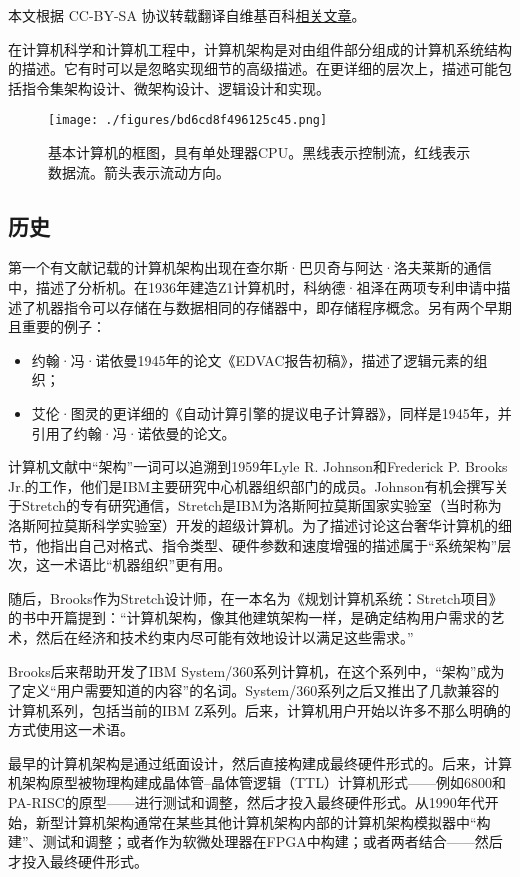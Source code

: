 
本文根据 CC-BY-SA 协议转载翻译自维基百科\href{https://en.wikipedia.org/wiki/Computer_architecture}{相关文章}。
  
在计算机科学和计算机工程中，计算机架构是对由组件部分组成的计算机系统结构的描述。它有时可以是忽略实现细节的高级描述。在更详细的层次上，描述可能包括指令集架构设计、微架构设计、逻辑设计和实现。
\begin{figure}[ht]
\centering
\texttt{[image: ./figures/bd6cd8f496125c45.png]}
\caption{基本计算机的框图，具有单处理器CPU。黑线表示控制流，红线表示数据流。箭头表示流动方向。} \label{fig_CORE_1}
\end{figure}
\subsection{历史}  
第一个有文献记载的计算机架构出现在查尔斯·巴贝奇与阿达·洛夫莱斯的通信中，描述了分析机。在1936年建造Z1计算机时，科纳德·祖泽在两项专利申请中描述了机器指令可以存储在与数据相同的存储器中，即存储程序概念。另有两个早期且重要的例子：

\begin{itemize}
\item 约翰·冯·诺依曼1945年的论文《EDVAC报告初稿》，描述了逻辑元素的组织；  
\item 艾伦·图灵的更详细的《自动计算引擎的提议电子计算器》，同样是1945年，并引用了约翰·冯·诺依曼的论文。
\end{itemize}

计算机文献中“架构”一词可以追溯到1959年Lyle R. Johnson和Frederick P. Brooks Jr.的工作，他们是IBM主要研究中心机器组织部门的成员。Johnson有机会撰写关于Stretch的专有研究通信，Stretch是IBM为洛斯阿拉莫斯国家实验室（当时称为洛斯阿拉莫斯科学实验室）开发的超级计算机。为了描述讨论这台奢华计算机的细节，他指出自己对格式、指令类型、硬件参数和速度增强的描述属于“系统架构”层次，这一术语比“机器组织”更有用。

随后，Brooks作为Stretch设计师，在一本名为《规划计算机系统：Stretch项目》的书中开篇提到：“计算机架构，像其他建筑架构一样，是确定结构用户需求的艺术，然后在经济和技术约束内尽可能有效地设计以满足这些需求。”

Brooks后来帮助开发了IBM System/360系列计算机，在这个系列中，“架构”成为了定义“用户需要知道的内容”的名词。System/360系列之后又推出了几款兼容的计算机系列，包括当前的IBM Z系列。后来，计算机用户开始以许多不那么明确的方式使用这一术语。

最早的计算机架构是通过纸面设计，然后直接构建成最终硬件形式的。后来，计算机架构原型被物理构建成晶体管–晶体管逻辑（TTL）计算机形式——例如6800和PA-RISC的原型——进行测试和调整，然后才投入最终硬件形式。从1990年代开始，新型计算机架构通常在某些其他计算机架构内部的计算机架构模拟器中“构建”、测试和调整；或者作为软微处理器在FPGA中构建；或者两者结合——然后才投入最终硬件形式。